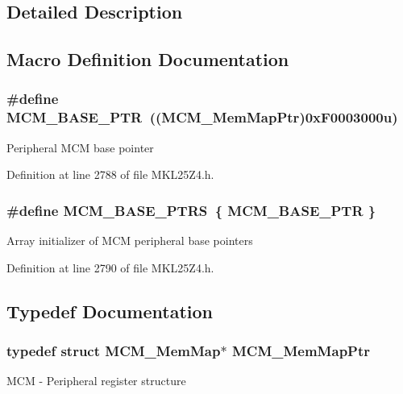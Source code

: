 \subsection{Detailed Description}


\subsection{Macro Definition Documentation}
\subsubsection[{\texorpdfstring{M\+C\+M\+\_\+\+B\+A\+S\+E\+\_\+\+P\+TR}{MCM_BASE_PTR}}]{\setlength{\rightskip}{0pt plus 5cm}\#define M\+C\+M\+\_\+\+B\+A\+S\+E\+\_\+\+P\+TR~(({\bf M\+C\+M\+\_\+\+Mem\+Map\+Ptr})0x\+F0003000u)}\hypertarget{group___m_c_m___peripheral_gad41e931f176c230831e3dbad45117841}{}\label{group___m_c_m___peripheral_gad41e931f176c230831e3dbad45117841}
Peripheral M\+CM base pointer 

Definition at line 2788 of file M\+K\+L25\+Z4.\+h.

\subsubsection[{\texorpdfstring{M\+C\+M\+\_\+\+B\+A\+S\+E\+\_\+\+P\+T\+RS}{MCM_BASE_PTRS}}]{\setlength{\rightskip}{0pt plus 5cm}\#define M\+C\+M\+\_\+\+B\+A\+S\+E\+\_\+\+P\+T\+RS~\{ {\bf M\+C\+M\+\_\+\+B\+A\+S\+E\+\_\+\+P\+TR} \}}\hypertarget{group___m_c_m___peripheral_gae2d5e838ce7d2d4108738c05bf224272}{}\label{group___m_c_m___peripheral_gae2d5e838ce7d2d4108738c05bf224272}
Array initializer of M\+CM peripheral base pointers 

Definition at line 2790 of file M\+K\+L25\+Z4.\+h.



\subsection{Typedef Documentation}
\subsubsection[{\texorpdfstring{M\+C\+M\+\_\+\+Mem\+Map\+Ptr}{MCM_MemMapPtr}}]{\setlength{\rightskip}{0pt plus 5cm}typedef struct {\bf M\+C\+M\+\_\+\+Mem\+Map}$\ast$ {\bf M\+C\+M\+\_\+\+Mem\+Map\+Ptr}}\hypertarget{group___m_c_m___peripheral_ga72e8bbe428d9410917903164d3a5f675}{}\label{group___m_c_m___peripheral_ga72e8bbe428d9410917903164d3a5f675}
M\+CM -\/ Peripheral register structure 